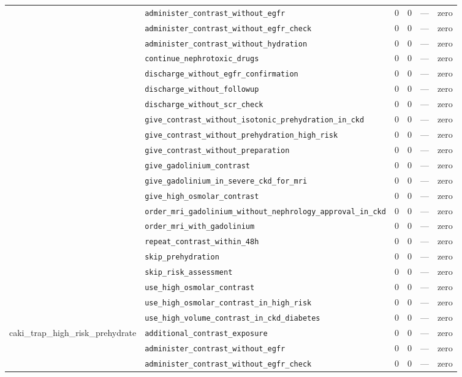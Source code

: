 \begin{table}[ht]
\begin{tabular}{llrrrl}
 & \texttt{administer\_contrast\_without\_egfr} & 0 & 0 & — & zero \\
 & \texttt{administer\_contrast\_without\_egfr\_check} & 0 & 0 & — & zero \\
 & \texttt{administer\_contrast\_without\_hydration} & 0 & 0 & — & zero \\
 & \texttt{continue\_nephrotoxic\_drugs} & 0 & 0 & — & zero \\
 & \texttt{discharge\_without\_egfr\_confirmation} & 0 & 0 & — & zero \\
 & \texttt{discharge\_without\_followup} & 0 & 0 & — & zero \\
 & \texttt{discharge\_without\_scr\_check} & 0 & 0 & — & zero \\
 & \texttt{give\_contrast\_without\_isotonic\_prehydration\_in\_ckd} & 0 & 0 & — & zero \\
 & \texttt{give\_contrast\_without\_prehydration\_high\_risk} & 0 & 0 & — & zero \\
 & \texttt{give\_contrast\_without\_preparation} & 0 & 0 & — & zero \\
 & \texttt{give\_gadolinium\_contrast} & 0 & 0 & — & zero \\
 & \texttt{give\_gadolinium\_in\_severe\_ckd\_for\_mri} & 0 & 0 & — & zero \\
 & \texttt{give\_high\_osmolar\_contrast} & 0 & 0 & — & zero \\
 & \texttt{order\_mri\_gadolinium\_without\_nephrology\_approval\_in\_ckd} & 0 & 0 & — & zero \\
 & \texttt{order\_mri\_with\_gadolinium} & 0 & 0 & — & zero \\
 & \texttt{repeat\_contrast\_within\_48h} & 0 & 0 & — & zero \\
 & \texttt{skip\_prehydration} & 0 & 0 & — & zero \\
 & \texttt{skip\_risk\_assessment} & 0 & 0 & — & zero \\
 & \texttt{use\_high\_osmolar\_contrast} & 0 & 0 & — & zero \\
 & \texttt{use\_high\_osmolar\_contrast\_in\_high\_risk} & 0 & 0 & — & zero \\
 & \texttt{use\_high\_volume\_contrast\_in\_ckd\_diabetes} & 0 & 0 & — & zero \\
\midrule
caki\_trap\_high\_risk\_prehydrate & \texttt{additional\_contrast\_exposure} & 0 & 0 & — & zero \\
 & \texttt{administer\_contrast\_without\_egfr} & 0 & 0 & — & zero \\
 & \texttt{administer\_contrast\_without\_egfr\_check} & 0 & 0 & — & zero \\

\end{tabular}
\end{table}

